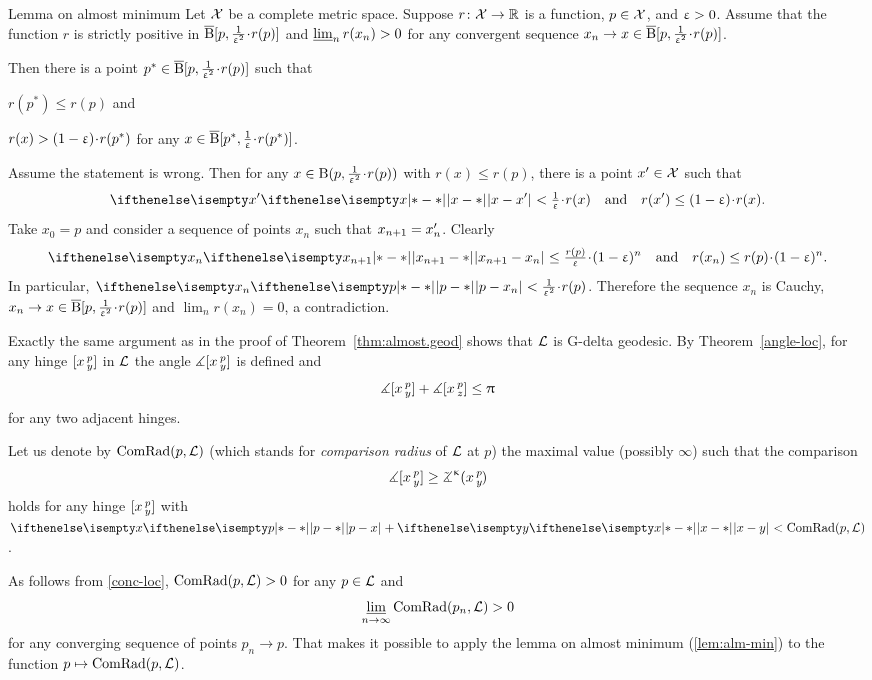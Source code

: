 \begin{thm}{Lemma on almost minimum}\label{lem:alm-min}
Let $\mathcal{X}$ be a complete metric space.
Suppose $r\:\spc{X}\to \RR$ is a function, $p\in \spc{X}$,   and $\upvarepsilon>0$.
Assume that the function $r$ is strictly positive in $\cBall[p,\tfrac{1}{\eps^2}\cdot r(p)]$ and
$\varliminf_{n}r(x_n)>0$ for any convergent sequence 
$x_n\to x\in \cBall[p,\tfrac{1}{\eps^2}\cdot r(p)]$. 

Then there is a point $p^*\in \cBall[p,\tfrac{1}{\eps^2}\cdot r(p)]$ such that 

\begin{subthm}{}$r(p^*)\le r(p)$ and
\end{subthm}

\begin{subthm}{}$r(x)> (1-\eps)\cdot r(p^*)$ 
for any $x\in \cBall[p^*,\tfrac{1}{\eps}\cdot r(p^*)]$.
\end{subthm}
\end{thm}

Assume the statement is wrong. 
Then for any $x\in \oBall(p,\tfrac{1}{\eps^2}\cdot r(p))$ with $r(x)\le r(p)$, there is a point $x'\in \spc{X}$ such that 
\[\dist{x}{x'}{}<\tfrac{1}\eps\cdot r(x)
\quad \text{and}\quad 
r(x')\le (1-\eps)\cdot r(x).\]
Take $x_0=p$ and consider a sequence of points $x_n$ such that $x_{n+1}\z=x_n'$.
Clearly 
\[\dist{x_{n+1}}{x_n}{}
\le
\tfrac{r(p)}{\eps}\cdot(1-\eps)^n
\quad \hbox{and}\quad 
r(x_n)\le r(p)\cdot(1-\eps)^n.\] 
In particular, $\dist{p}{x_n}{}<\tfrac{1}{\eps^2}\cdot r(p)$.
Therefore the sequence $x_n$ is Cauchy,
$x_n\to x\in \cBall[p,\tfrac{1}{\eps^2}\cdot r(p)]$
and
$\lim_{n}r(x_n)=0$, a contradiction.
\qeds




Exactly the same argument as in the proof of Theorem~\ref{thm:almost.geod} 
shows that $\mathcal{L}$ is G-delta geodesic.
By Theorem~\ref{angle-loc}, 
for any hinge $[x\,{}^{p}_{y}]$ in $\mathcal{L}$ the angle $\measuredangle[x\,{}^{p}_{y}]$ is defined 
and 
\[\mangle\hinge x p y+\mangle\hinge x p z\le \pi\] 
for any two adjacent hinges.

Let us denote by $\mathop{\rm ComRad}\nolimits(p,\mathcal{L})$ 
(which stands for \emph{comparison radius} of $\mathcal{L}$ at $p$) 
the maximal value (possibly $\infty$) such that the comparison 
\[\mangle\hinge x p y
\ge\angk\kappa x p y\]
holds for any hinge $[x\,{}^{p}_{y}]$ with $\dist{p}{x}{}+\dist{x}{y}{}< \ComRad(p,\spc{L})$.

As follows from \ref{conc-loc}, $\mathop{\rm ComRad}\nolimits(p,\mathcal{L})>0$ for any $p\in\spc{L}$ and 
$$\liminf_{n\to\infty}\ComRad(p_n,\spc{L})>0$$ 
for any converging sequence of points $p_n\to p$.
That makes it possible to apply the lemma on almost minimum (\ref{lem:alm-min}) to the function $p\mapsto \ComRad(p,\spc{L})$.

